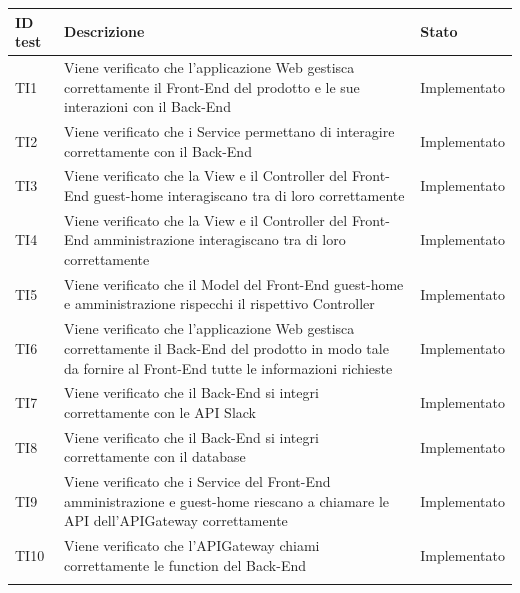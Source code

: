 \documentclass[../PianoDiQualifica_v4.0.0.tex]{subfiles}
\begin{document}
	\begin{longtable}[c] { >{\centering\arraybackslash}p{4cm} p{7cm} >{\centering\arraybackslash}p{4cm}}
		\toprule
		\centerline{\textbf{ID test}} & \centerline{\textbf{Descrizione}} & \centerline{\textbf{Stato}} \\
			\midrule
			TI1 & Viene verificato che l'applicazione Web gestisca correttamente il Front-End del prodotto e le sue interazioni con il Back-End & Implementato \\
			\addlinespace[0.3em]
			\midrule
			\addlinespace[0.3em]
			TI2 & Viene verificato che i Service permettano di interagire correttamente con il Back-End & Implementato \\
			\addlinespace[0.3em]
			\midrule
			\addlinespace[0.3em]
			TI3 & Viene verificato che la View e il Controller del Front-End guest-home interagiscano tra di loro correttamente & Implementato \\
			\addlinespace[0.3em]
			\midrule
			\addlinespace[0.3em]
			TI4 & Viene verificato che la View e il Controller del Front-End amministrazione interagiscano tra di loro correttamente & Implementato \\
			\addlinespace[0.3em]
			\midrule
			\addlinespace[0.3em]
			TI5 & Viene verificato che il Model del Front-End guest-home e amministrazione rispecchi il rispettivo Controller & Implementato \\
			\addlinespace[0.3em]
			\midrule
			\addlinespace[0.3em]
			TI6 & Viene verificato che l'applicazione Web gestisca correttamente il Back-End del prodotto in modo tale da fornire al Front-End tutte le informazioni richieste & Implementato \\
			\addlinespace[0.3em]
			\midrule
			\addlinespace[0.3em]
			TI7 & Viene verificato che il Back-End si integri correttamente con le API Slack & Implementato \\
			\addlinespace[0.3em]
			\midrule
			\addlinespace[0.3em]
			TI8 & Viene verificato che il Back-End si integri correttamente con il database & Implementato \\
			\addlinespace[0.3em]
			\midrule
			\addlinespace[0.3em]
			TI9 & Viene verificato che i Service del Front-End amministrazione e guest-home riescano a chiamare le API dell'APIGateway correttamente & Implementato \\
			\addlinespace[0.3em]
			\midrule
			\addlinespace[0.3em]
			TI10 & Viene verificato che l'APIGateway chiami correttamente le function del Back-End & Implementato \\
			\addlinespace[0.3em]

\end{longtable}
\end{document}
